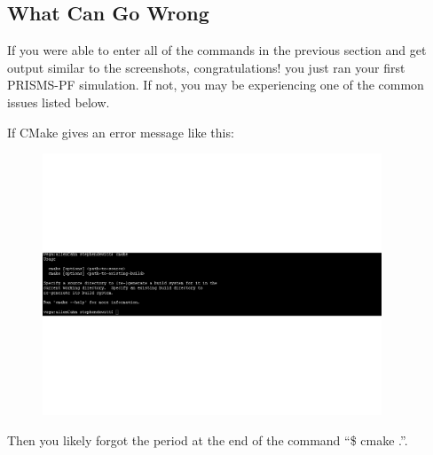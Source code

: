 \documentclass[10pt]{article} %
\begin{document}
\subsection{What Can Go Wrong}
If you were able to enter all of the commands in the previous section and get output similar to the screenshots, congratulations! you just ran your first PRISMS-PF simulation. If not, you may be experiencing one of the common issues listed below.

If CMake gives an error message like this:
\begin{figure}[H]
\vspace{-90pt}
\centering
\includegraphics[width=0.9\textwidth,trim={0 0 12cm 0},clip]{cmake_no_period}
\vspace{-90pt}
\end{figure}
Then you likely forgot the period at the end of the command ``\$ cmake .''.
\end{document}
